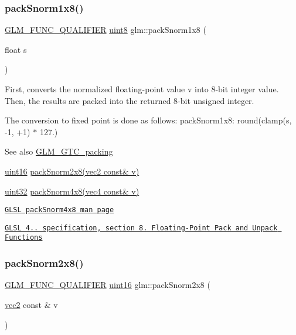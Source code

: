 \subsubsection{\texorpdfstring{pack\+Snorm1x8()}{packSnorm1x8()}}
{\footnotesize\ttfamily \hyperlink{setup_8hpp_a33fdea6f91c5f834105f7415e2a64407}{G\+L\+M\+\_\+\+F\+U\+N\+C\+\_\+\+Q\+U\+A\+L\+I\+F\+I\+ER} \hyperlink{group__gtc__type__precision_ga1a7dcd8aac97cc8020817c94049deff2}{uint8} glm\+::pack\+Snorm1x8 (\begin{DoxyParamCaption}\item[{float}]{s }\end{DoxyParamCaption})}

First, converts the normalized floating-\/point value v into 8-\/bit integer value. Then, the results are packed into the returned 8-\/bit unsigned integer.

The conversion to fixed point is done as follows\+: pack\+Snorm1x8\+: round(clamp(s, -\/1, +1) $\ast$ 127.)

\begin{DoxySeeAlso}{See also}
\hyperlink{group__gtc__packing}{G\+L\+M\+\_\+\+G\+T\+C\+\_\+packing} 

\hyperlink{group__gtc__type__precision_gad8c2939e1fdd8e5828b31d95c52255d5}{uint16} \hyperlink{group__gtc__packing_ga05d08a82923166ec7cd5d0e6154c9953}{pack\+Snorm2x8(vec2 const\& v)} 

\hyperlink{group__gtc__type__precision_ga202b6a53c105fcb7e531f9b443518451}{uint32} \hyperlink{group__core__func__packing_ga85e8f17627516445026ab7a9c2e3531a}{pack\+Snorm4x8(vec4 const\& v)} 

\href{http://www.opengl.org/sdk/docs/manglsl/xhtml/packSnorm4x8.xml}{\tt G\+L\+SL pack\+Snorm4x8 man page} 

\href{http://www.opengl.org/registry/doc/GLSLangSpec.4.20.8.pdf}{\tt G\+L\+SL 4.. specification, section 8. Floating-\/\+Point Pack and Unpack Functions} 
\end{DoxySeeAlso}
\mbox{\label{group__gtc__packing_ga05d08a82923166ec7cd5d0e6154c9953}} 
\subsubsection{\texorpdfstring{pack\+Snorm2x8()}{packSnorm2x8()}}
{\footnotesize\ttfamily \hyperlink{setup_8hpp_a33fdea6f91c5f834105f7415e2a64407}{G\+L\+M\+\_\+\+F\+U\+N\+C\+\_\+\+Q\+U\+A\+L\+I\+F\+I\+ER} \hyperlink{group__gtc__type__precision_gad8c2939e1fdd8e5828b31d95c52255d5}{uint16} glm\+::pack\+Snorm2x8 (\begin{DoxyParamCaption}\item[{\hyperlink{group__core__types_gaa1618f51db67eaa145db101d8c8431d8}{vec2} const \&}]{v }\end{DoxyParamCaption})}

